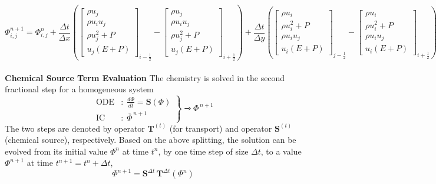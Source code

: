 \documentclass{homework}
\begin{document}
\begin{equation}
    \Phi_{i,j}^{n+1} = \Phi_{i,j}^n + \frac{\Delta t}{\Delta x} \left( \begin{bmatrix}
    \rho u_j \\[4pt]
    \rho u_i u_j \\[4pt]
    \rho u_j^2 + P \\[4pt]
    u_j(E + P)
    \end{bmatrix}_{i-\frac{1}{2}} - \begin{bmatrix}
    \rho u_j \\[4pt]
    \rho u_i u_j \\[4pt]
    \rho u_j^2 + P \\[4pt]
    u_j(E + P)
    \end{bmatrix}_{i+\frac{1}{2}} \right) + \frac{\Delta t}{\Delta y} \left( \begin{bmatrix}
    \rho u_i \\[4pt]
    \rho u_i^2 + P \\[4pt]
    \rho u_i u_j \\[4pt]
    u_i(E + P)
    \end{bmatrix}_{j-\frac{1}{2}} - \begin{bmatrix}
    \rho u_i \\[4pt]
    \rho u_i^2 + P \\[4pt]
    \rho u_i u_j \\[4pt]
    u_i(E + P)
    \end{bmatrix}_{i+\frac{1}{2}} \right)
\end{equation}
\\ \textbf{Chemical Source Term Evaluation}
The chemistry is solved in the second fractional step for a homogeneous system
\begin{equation*}
    \left.
    \begin{aligned}
        \textrm{ODE}&: \; \frac{d \Phi}{d t} = \textbf{S} (\Phi) \\
        \textrm{IC}&: \; \overline{\Phi}^{\, n+1}
    \end{aligned}
    \right\} \rightarrowtriangle \Phi^{\, n+1}
\end{equation*}
The two steps are denoted by operator $\textbf{T}^{(t)}$ (for transport) and operator $\textbf{S}^{(t)}$ (chemical source), respectively. Based on the above splitting, the solution can be evolved from its initial value $\Phi^n$ at time $t^n$, by one time step of size $\Delta t$, to a value $\Phi^{n+1}$ at time
$t^{n+1} = t^n + \Delta t$,
$$\Phi^{n+1} = \textbf{S}^{\Delta t} \, \textbf{T}^{\Delta t} (\Phi^n)$$
\end{document}

